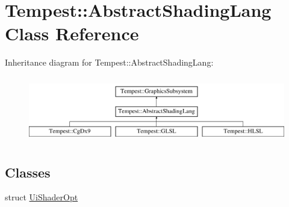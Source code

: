 \hypertarget{class_tempest_1_1_abstract_shading_lang}{\section{Tempest\+:\+:Abstract\+Shading\+Lang Class Reference}
\label{class_tempest_1_1_abstract_shading_lang}
}
Inheritance diagram for Tempest\+:\+:Abstract\+Shading\+Lang\+:\begin{figure}[H]
\begin{center}
\leavevmode
\includegraphics[height=2.901554cm]{class_tempest_1_1_abstract_shading_lang}
\end{center}
\end{figure}
\subsection*{Classes}
\begin{DoxyCompactItemize}
\item 
struct \hyperlink{struct_tempest_1_1_abstract_shading_lang_1_1_ui_shader_opt}{Ui\+Shader\+Opt}
\end{DoxyCompactItemize}
